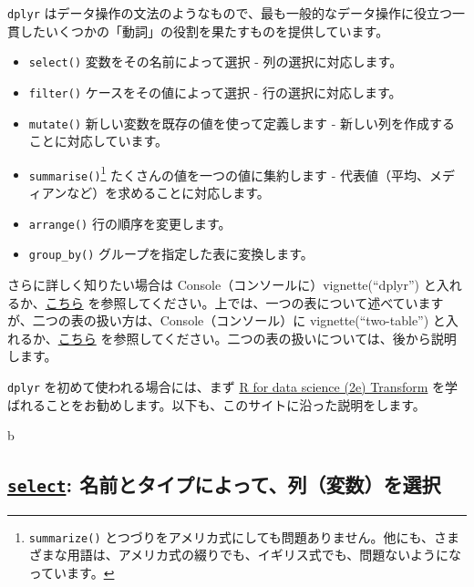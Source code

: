 \documentclass[
  xelatex, ja=standard]{bxjsbook}
\providecommand{\tightlist}{%
  \setlength{\itemsep}{0pt}\setlength{\parskip}{0pt}}
\theoremstyle{definition}
\theoremstyle{definition}
\theoremstyle{definition}
\theoremstyle{definition}
\theoremstyle{remark}
\begin{document}
\texttt{dplyr} はデータ操作の文法のようなもので、最も一般的なデータ操作に役立つ一貫したいくつかの「動詞」の役割を果たすものを提供しています。

\begin{itemize}
\tightlist
\item
  \texttt{select()} 変数をその名前によって選択 - 列の選択に対応します。
\item
  \texttt{filter()} ケースをその値によって選択 - 行の選択に対応します。
\item
  \texttt{mutate()} 新しい変数を既存の値を使って定義します - 新しい列を作成することに対応しています。
\item
  \texttt{summarise()}\footnote{\texttt{summarize()} とつづりをアメリカ式にしても問題ありません。他にも、さまざまな用語は、アメリカ式の綴りでも、イギリス式でも、問題ないようになっています。} たくさんの値を一つの値に集約します - 代表値（平均、メディアンなど）を求めることに対応します。
\item
  \texttt{arrange()} 行の順序を変更します。
\item
  \texttt{group\_by()} グループを指定した表に変換します。
\end{itemize}

さらに詳しく知りたい場合は Console（コンソールに）vignette(``dplyr'') と入れるか、\href{https://cran.r-project.org/web/packages/dplyr/vignettes/dplyr.html}{こちら} を参照してください。上では、一つの表について述べていますが、二つの表の扱い方は、Console（コンソール）に vignette(``two-table'') と入れるか、\href{https://cran.r-project.org/web/packages/dplyr/vignettes/two-table.html}{こちら} を参照してください。二つの表の扱いについては、後から説明します。

\texttt{dplyr} を初めて使われる場合には、まず \href{https://r4ds.hadley.nz/transform}{R for data science (2e) Transform} を学ばれることをお勧めします。以下も、このサイトに沿った説明をします。

b

\hypertarget{select-ux540dux524dux3068ux30bfux30a4ux30d7ux306bux3088ux3063ux3066ux5217ux5909ux6570ux3092ux9078ux629e}{%
\subsection{\texorpdfstring{\href{https://dplyr.tidyverse.org/reference/select.html}{\texttt{select}}: 名前とタイプによって、列（変数）を選択}{select: 名前とタイプによって、列（変数）を選択}}\label{select-ux540dux524dux3068ux30bfux30a4ux30d7ux306bux3088ux3063ux3066ux5217ux5909ux6570ux3092ux9078ux629e}}
\end{document}
